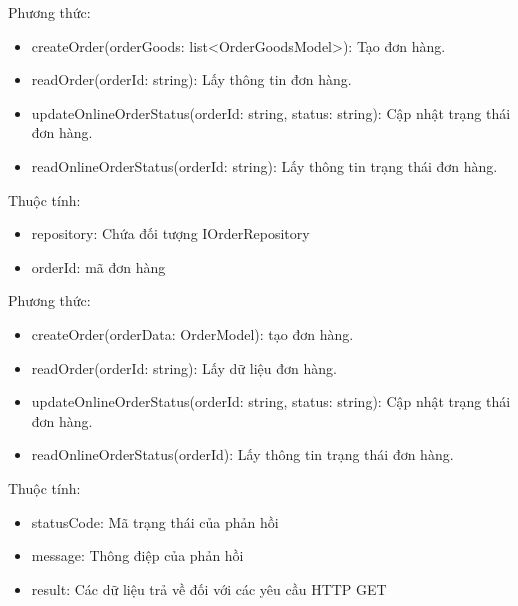 Phương thức:
\begin{itemize}
	\item createOrder(orderGoods: list<OrderGoodsModel>): Tạo đơn hàng.
	\item readOrder(orderId: string): Lấy thông tin đơn hàng.
	\item updateOnlineOrderStatus(orderId: string, status: string): Cập nhật trạng thái đơn hàng.
	\item readOnlineOrderStatus(orderId: string): Lấy thông tin trạng thái đơn hàng.
\end{itemize}

Thuộc tính:
\begin{itemize}
	\item repository: Chứa đối tượng IOrderRepository
	\item orderId: mã đơn hàng
\end{itemize}
Phương thức:
\begin{itemize}
	\item createOrder(orderData: OrderModel): tạo đơn hàng.
	\item readOrder(orderId: string): Lấy dữ liệu đơn hàng.
	\item updateOnlineOrderStatus(orderId: string, status: string): Cập nhật trạng thái đơn hàng.
	\item readOnlineOrderStatus(orderId): Lấy thông tin trạng thái đơn hàng.
\end{itemize}


Thuộc tính:
\begin{itemize}
	\item statusCode: Mã trạng thái của phản hồi
	\item message: Thông điệp của phản hồi
	\item result: Các dữ liệu trả về đối với các yêu cầu HTTP GET
\end{itemize}

\newpage


